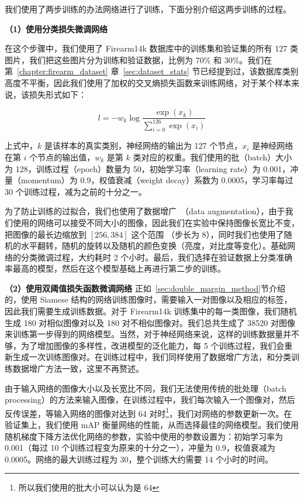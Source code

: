 我们使用了两步训练的办法网络进行了训练，下面分别介绍这两步训练的过程。

\textbf{（1）使用分类损失微调网络}

在这个步骤中，我们使用了 Firearm14k 数据库中的训练集和验证集的所有 127 类图片，我们把这些图片分为训练和验证数据，比例为 70\% 和 30\%。我们在第~\ref{chapter:firearm_dataset} 章~\ref{sec:dataset_stats} 节已经提到过，该数据库类别高度不平衡，因此我们使用了加权的交叉熵损失函数来训练网络，对于某个样本来说，该损失形式如下：

\begin{equation}
l = -w_k \log\frac{\exp(x_k)}{\sum_{i=0}^{126} \exp(x_i)}
\end{equation}

上式中，$k$ 是该样本的真实类别，神经网络的输出为 127 个节点，$x_i$ 是神经网络在第 $i$ 个节点的输出值，$w_k$ 是第 $k$ 类对应的权重。我们使用的批（batch）大小为 128，训练过程（epoch）数量为 50，初始学习率（learning rate）为 0.001，冲量（momentum）为 0.9，权值衰减（weight decay）系数为 0.0005，学习率每过 30 个训练过程，减为之前的十分之一。

为了防止训练的过拟合，我们也使用了数据增广~\cite{Krizhevsky2012ImageNetCW}（data augmentation），由于我们使用的网络可以接受不同大小的图像，因此我们在实验中保持图像长宽比不变，把图像的最长边缩放到 $[256, 384]$ 这个范围 （步长为 8），同时我们也使用了随机的水平翻转，随机的旋转以及随机的颜色变换（亮度，对比度等变化）。基础网络的分类微调过程，大约耗时 2 个小时。最后，我们选择在验证数据上分类准确率最高的模型，然后在这个模型基础上再进行第二步的训练。

\textbf{（2）使用双阈值损失函数微调网络}
正如~\ref{sec:double_margin_method}节介绍的，使用 Siamese 结构的网络训练图像时，需要输入一对图像以及相应的标签，因此我们需要生成训练数据。对于 Firearm14k 训练集中的每一类图像，我们随机生成 180 对相似图像对以及 180 对不相似图像对。我们总共生成了 38520 对图像来训练第一步得到的网络模型。当然，对于神经网络来说，这样的训练数据量并不够，为了增加图像的多样性，改进模型的泛化能力，每 5 个训练过程，我们会重新生成一次训练图像对。在训练过程中，我们同样使用了数据增广方法，和分类训练数据增广方法一致，这里不再赘述。

由于输入网络的图像大小以及长宽比不同，我们无法使用传统的批处理（batch processing）的方法来输入图像，在训练过程中，我们每次输入一个图像对，然后反传误差，等输入网络的图像对达到 64 对时\footnote{所以我们使用的批大小可以认为是 64}，我们对网络的参数更新一次。在验证集上，我们使用 mAP 衡量网络的性能，从而选择最佳的网络模型。我们使用随机梯度下降方法优化网络的参数，实验中使用的参数设置为：初始学习率为 0.001（每过 10 个训练过程变为原来的十分之一），冲量为 0.9，权值衰减为 0.0005。网络的最大训练过程为 30，整个训练大约需要 14 个小时的时间。

